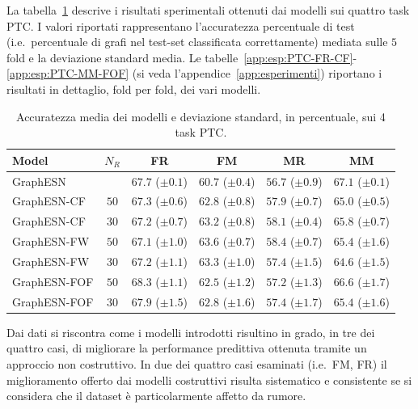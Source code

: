 La tabella~\ref{tab:esperimenti:ptc} descrive i risultati sperimentali ottenuti dai modelli sui quattro task PTC. I valori riportati rappresentano l'accuratezza percentuale di test (i.e.\ percentuale di grafi nel test-set classificata correttamente) mediata sulle $5$ fold e la deviazione standard media. Le tabelle~\ref{app:esp:PTC-FR-CF}-\ref{app:esp:PTC-MM-FOF} (si veda l'appendice~\vref{app:esperimenti}) riportano i risultati in dettaglio, fold per fold, dei vari modelli.
\begin{table}[tbp]
\small
\caption[Accuratezza media su PTC]{Accuratezza media dei modelli e deviazione standard, in percentuale, sui 4 task PTC.}
\label{tab:esperimenti:ptc}
\centering	
\begin{tabular}{l*{5}{c}}
\toprule
Model 		& $N_R$	& FR				 & FM				  & MR				   & MM	\\
\midrule
GraphESN 	& 	    & $67.7$ ($\pm 0.1$) & $60.7$ ($\pm 0.4$) & $56.7$ ($\pm 0.9$) & $67.1$ ($\pm 0.1$) \\
GraphESN-CF & $50$  & $67.3$ ($\pm 0.6$) & $62.8$ ($\pm 0.8$) & $57.9$ ($\pm 0.7$) & $65.0$ ($\pm 0.5$) \\
GraphESN-CF & $30$  & $67.2$ ($\pm 0.7$) & $63.2$ ($\pm 0.8$) & $58.1$ ($\pm 0.4$) & $65.8$ ($\pm 0.7$) \\
GraphESN-FW & $50$  & $67.1$ ($\pm 1.0$) & $63.6$ ($\pm 0.7$) & $58.4$ ($\pm 0.7$) & $65.4$ ($\pm 1.6$) \\
GraphESN-FW & $30$  & $67.2$ ($\pm 1.1$) & $63.3$ ($\pm 1.0$) & $57.4$ ($\pm 1.5$) & $64.6$ ($\pm 1.5$) \\
GraphESN-FOF & $50$ & $68.3$ ($\pm 1.1$) & $62.5$ ($\pm 1.2$) & $57.2$ ($\pm 1.3$) & $66.6$ ($\pm 1.7$) \\
GraphESN-FOF & $30$ & $67.9$ ($\pm 1.5$) & $62.8$ ($\pm 1.6$) & $57.4$ ($\pm 1.7$) & $65.4$ ($\pm 1.6$) \\
\bottomrule
\end{tabular}
\end{table}
Dai dati si riscontra come i modelli introdotti risultino in grado, in tre dei quattro casi, di migliorare la performance predittiva ottenuta tramite un approccio non costruttivo. In due dei quattro casi esaminati (i.e.\ FM, FR) il miglioramento offerto dai modelli costruttivi risulta sistematico e consistente se si considera che il dataset è particolarmente affetto da rumore.

